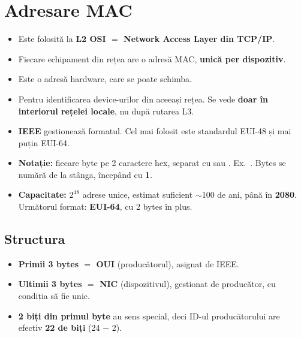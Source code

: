 \documentclass[11pt,a4paper]{article}
\begin{document}

\section{Adresare MAC}
\begin{itemize}
  \item Este folosită la \textbf{L2 OSI $=$ Network Access Layer din TCP/IP}.
  \item Fiecare echipament din rețea are o adresă MAC, \textbf{unică per dispozitiv}.
  \item Este o adresă hardware, care se poate schimba.
  \item Pentru identificarea device-urilor din aceeași rețea. Se vede \textbf{doar în interiorul rețelei locale}, nu după rutarea L3.
  \item \textbf{IEEE} gestionează formatul. Cel mai folosit este standardul EUI-48 și mai puțin EUI-64.
  \item \textbf{Notație:} fiecare byte pe 2 caractere hex, separat cu \cod{:} sau \cod{-}. Ex.\ . Bytes se numără de la stânga, începând cu \textbf{1}.
  \item \textbf{Capacitate:} $2^{48}$ adrese unice, estimat suficient $\sim$100 de ani, până în \textbf{2080}. Următorul format: \textbf{EUI-64}, cu 2 bytes în plus.
\end{itemize}


\subsection*{Structura}
\begin{itemize}
  \item \textbf{Primii 3 bytes $=$ OUI} (producătorul), asignat de IEEE.
  \item \textbf{Ultimii 3 bytes $=$ NIC} (dispozitivul), gestionat de producător, cu condiția să fie unic.
  \item \textbf{2 biți din primul byte} au sens special, deci ID-ul producătorului are efectiv \textbf{22 de biți} (24 $-$ 2).
\end{itemize}
\end{document}
